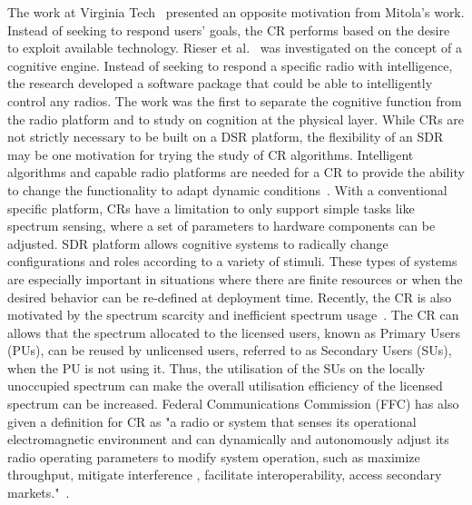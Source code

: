 The work at Virginia Tech~\cite{MacKenzie2009} presented an opposite motivation from Mitola’s work. Instead of seeking to respond users’ goals, the CR performs based on the desire
to exploit available technology. Rieser et al.~\cite{Rieser2007,Rondeau2004} was investigated on the concept of a cognitive engine. Instead of seeking to respond a specific radio with intelligence, the research
developed a software package that could be able to intelligently control any radios. The work was the first to separate the cognitive function from the radio platform and to study on cognition at the physical layer.
While CRs are not strictly necessary to be built on a DSR platform, the flexibility of an SDR may be one motivation for trying the study of CR algorithms. 
Intelligent algorithms and capable radio platforms are needed for a CR to provide the ability to change the functionality to adapt dynamic conditions~\cite{MacKenzie2009}.
With a conventional specific platform, CRs have a limitation to only support simple tasks like spectrum sensing, where a set of parameters to hardware components can be adjusted. SDR platform allows cognitive systems to radically change configurations and roles according to a variety of stimuli. These types of systems are especially important in situations where there are finite resources or when the desired behavior can be re-defined at deployment time.
Recently, the CR is also motivated by the spectrum scarcity and inefficient spectrum usage~\cite{FCC2002,Ghasemi2008}. The CR can allows that the spectrum allocated to the licensed users, known as Primary Users (PUs), can be reused by unlicensed users, referred to as Secondary Users (SUs), when the PU is not using it. Thus, the utilisation of the SUs on the locally unoccupied spectrum can make the overall utilisation efficiency of the licensed spectrum can be increased. Federal Communications Commission (FFC) has also given a definition for CR as "a radio or system that senses its operational electromagnetic environment and can dynamically and autonomously adjust its radio operating parameters to modify system operation, such as maximize throughput, mitigate interference , facilitate interoperability, access secondary markets."~\cite{FCC2005}.

